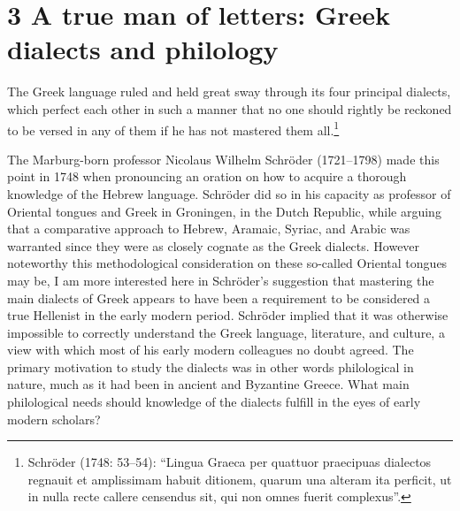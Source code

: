 \clearpage\section[3 A true man of letters: Greek dialects and philology]{\textsc{3 }A true man of letters: Greek dialects and philology}
\hypertarget{Toc19704818}{}\begin{styleQuote}
The Greek language ruled and held great sway through its four principal dialects, which perfect each other in such a manner that no one should rightly be reckoned to be versed in any of them if he has not mastered them all.\footnote{ Schröder (1748: 53–54): “Lingua Graeca per quattuor praecipuas dialectos regnauit et amplissimam habuit ditionem, quarum una alteram ita perficit, ut in nulla recte callere censendus sit, qui non omnes fuerit complexus”.}
\end{styleQuote}

\begin{styleStandard}
The Marburg-born professor Nicolaus Wilhelm Schröder (1721–1798) made this point in 1748 when pronouncing an oration on how to acquire a thorough knowledge of the Hebrew language. Schröder did so in his capacity as professor of Oriental tongues and Greek in Groningen, in the Dutch Republic, while arguing that a comparative approach to Hebrew, Aramaic, Syriac, and Arabic was warranted since they were as closely cognate as the Greek dialects. However noteworthy this methodological consideration on these so-called Oriental tongues may be, I am more interested here in Schröder’s suggestion that mastering the main dialects of Greek appears to have been a requirement to be considered a true Hellenist in the early modern period. Schröder implied that it was otherwise impossible to correctly understand the Greek language, literature, and culture, a view with which most of his early modern colleagues no doubt agreed. The primary motivation to study the dialects was in other words philological in nature, much as it had been in ancient and Byzantine Greece. What main philological needs should knowledge of the dialects fulfill in the eyes of early modern scholars?
\end{styleStandard}

